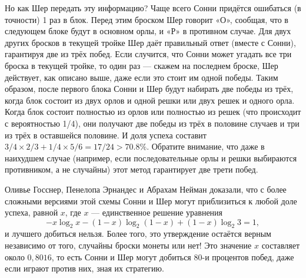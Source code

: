 Но как Шер передать эту информацию?
Чаще всего Сонни придётся ошибаться (в точности) 1 раз в блок.
Перед этим броском Шер говорит «О», сообщая, что в следующем блоке будут в основном орлы, и «Р» в противном случае.
Для двух других бросков в текущей тройке Шер даёт правильный ответ (вместе с Сонни), гарантируя две из трёх побед.
Если случится, что Сонни может угадать все три броска в текущей тройке,
то один раз --- скажем на последнем броске, Шер действует, как описано выше, даже если это стоит им одной победы.
Таким образом, после первого блока Сонни и Шер будут набирать две победы из трёх, когда блок состоит из двух орлов и одной решки или двух решек и одного орла.
Когда блок состоит полностью из орлов или полностью из решек (что происходит с вероятностью 1/4), они получают две победы из трёх в половине случаев и три из трёх в оставшейся половине.
И доля успеха составит $3/4 \times 2/3 + 1/4 \times 5/6 = 17/24 > 70.8\%$.
Обратите внимание, что даже в наихудшем случае (например, если последовательные орлы и решки выбираются противником, а не случайны) этот метод гарантирует две трети побед.

Оливье Госснер, Пенелопа Эрнандес и Абрахам Нейман \cite{32} доказали, что с более сложными версиями этой схемы Сонни и Шер могут приблизиться к любой доле успеха, равной $x$, где $x$ --- единственное решение уравнения
\[-x \log_2 x - (1 - x) \log_2 (1 - x) + (1 - x) \log_2 3 = 1,\]
и лучшего добиться нельзя.
Более того, это утверждение остаётся верным независимо от того, случайны броски монеты или нет!
Это значение $x$ составляет около $0{,}8016$, то есть Сонни и Шер могут добиться  $80$-и процентов побед, даже если играют против них, зная их стратегию.


